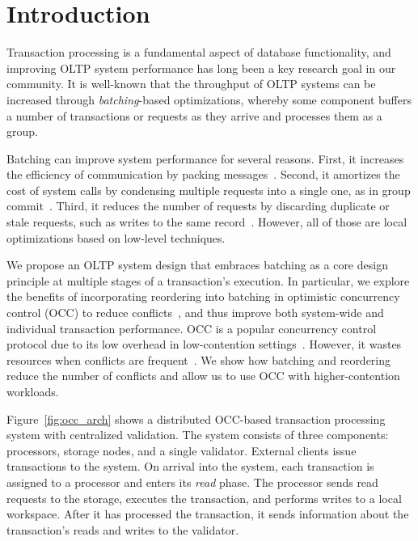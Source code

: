 \section{Introduction}\label{sec:intro}

Transaction processing is a fundamental aspect of database functionality, and improving OLTP system performance has long been a key research goal in our community. It is well-known that the throughput of OLTP systems can be increased through \emph{batching}-based optimizations, whereby some component buffers a number of transactions or requests as they arrive and processes them as a group.

Batching can improve system performance for several reasons. First, it increases the efficiency of communication by packing messages~\cite{ding2015centiman,friedman1997packing}. Second, it amortizes the cost of system calls by condensing multiple requests into a single one, as in group commit~\cite{debrabant2013anti,hagmann1987reimplementing}. Third, it reduces the number of requests by discarding duplicate or stale requests, such as writes to the same record~\cite{faleiro2014lazy}. However, all of those are local optimizations based on low-level techniques.

We propose an OLTP system design that embraces batching as a core design principle at multiple stages of a transaction's execution. In particular, we explore the benefits of incorporating reordering into batching in optimistic concurrency control (OCC) to reduce conflicts~\cite{kung81tods}, and thus improve both system-wide and individual transaction performance. OCC is a popular concurrency control protocol due to its low overhead in low-contention settings~\cite{adya97podc, baker11cidr, bernstein2015optimizing,bernstein11cidr, bernstein11vldb, corbett12osdi,warp, patterson12vldb,peng10osdi}. However, it wastes resources when conflicts are frequent~\cite{agrawal1987concurrency}. We show how batching and reordering reduce the number of conflicts and allow us to use OCC with higher-contention workloads.


Figure~\ref{fig:occ_arch} shows a distributed OCC-based transaction processing system with centralized validation. The system consists of three components: processors, storage nodes, and a single validator. External clients issue transactions to the system. On arrival into the system, each transaction is assigned to a processor and enters its \emph{read} phase. The processor sends read requests to the storage, executes the transaction, and performs writes to a local workspace. After it has processed the transaction, it sends information about the transaction's reads and writes to the validator. 

